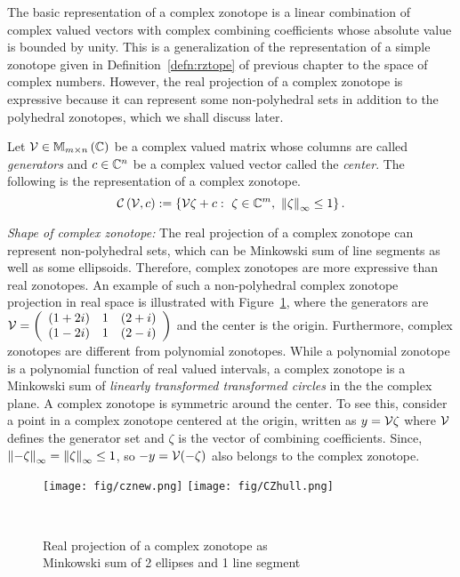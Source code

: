 The basic representation of a complex zonotope is a linear combination
of complex valued vectors with complex combining coefficients whose
absolute value is bounded by unity.  This is a generalization of the
representation of a simple zonotope given in Definition~\ref{defn:rztope} of
previous chapter to the space of complex numbers.  However, the real
projection of a complex zonotope is expressive because it can
represent some non-polyhedral sets in addition to the polyhedral
zonotopes, which we shall discuss later.
%
\begin{definition}
Let $\mathcal{V}\in\mathbb{M}_{m\times n}\left(\mathbb{C}\right)$ be a complex valued matrix
whose columns are called {\it generators} and $c\in\mathbb{C}^n$ be a
complex valued vector called the {\it center}.  The following is the
representation of a
complex zonotope.
%
\begin{equation}
\mathit{\mathcal{C}}\left(\mathcal{V},c\right) := \left\{\mathcal{V}\zeta+c:~\zeta\in\mathbb{C}^m,~\left\|\zeta\right\|_{\infty}\leq 1\right\}.
\end{equation}
%
\end{definition}
%
{\it Shape of complex zonotope:} The real projection of a complex
zonotope can represent non-polyhedral sets, which can be Minkowski sum
of line segments as well as some ellipsoids.  Therefore, complex
zonotopes are more expressive than real zonotopes.  An example of such
a non-polyhedral complex zonotope projection in real space is
illustrated with Figure~\ref{fig:cz}, where the generators are
$\mathcal{V}=\left(\begin{array}{lll}(1+2i) & 1 & (2+i)\\(1-2i) & 1 &
(2-i)\end{array}\right)$ and the center is the origin.  Furthermore,
complex zonotopes are different from polynomial zonotopes.  While a
polynomial zonotope is a polynomial function of real valued intervals,
a complex zonotope is a Minkowski sum of \emph{linearly transformed
transformed circles} in the the complex plane.  A complex zonotope is
symmetric around the center.  To see this, consider a point in a
complex zonotope centered at the origin, written as $y=\mathcal{V}\zeta$
where $\mathcal{V}$ defines the generator set and $\zeta$ is the vector of
combining coefficients.  Since, $\left\|-\zeta\right\|_{\infty}=\left\|\zeta\right\|_{\infty}\leq
1$, so $-y=\mathcal{V}(-\zeta)$ also belongs to the complex zonotope.
%
\begin{figure}
\centering
\captionsetup{justification=centering}
\texttt{[image: fig/cznew.png]}
\texttt{[image: fig/CZhull.png]}
\caption{Real projection of a complex zonotope as\\ Minkowski sum of 2 ellipses and 1 line segment }~\label{fig:cz}
\end{figure}

